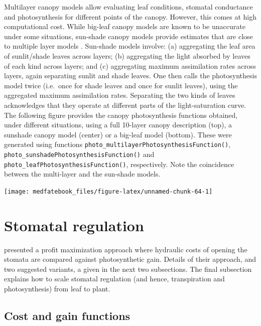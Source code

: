\documentclass[]{book}
\begin{document}
Multilayer canopy models allow evaluating leaf conditions, stomatal
conductance and photosynthesis for different points of the canopy.
However, this comes at high computational cost. While big-leaf canopy
models are known to be unaccurate under some situations, sun-shade
canopy models \citep{DePury1997} provide estimates that are close to
multiple layer models \citep{Hikosaka2016}. Sun-shade models involve:
(a) aggregating the leaf area of sunlit/shade leaves across layers; (b)
aggregating the light absorbed by leaves of each kind across layers; and
(c) aggregating maximum assimilation rates across layers, again
separating sunlit and shade leaves. One then calls the photosynthesis
model twice (i.e.~once for shade leaves and once for sunlit leaves),
using the aggregated maximum assimilation rates. Separating the two
kinds of leaves acknowledges that they operate at different parts of the
light-saturation curve. The following figure provides the canopy
photosynthesis functions obtained, under different situations, using a
full 10-layer canopy description (top), a sunshade canopy model (center)
or a big-leaf model (bottom). These were generated using functions
\texttt{photo\_multilayerPhotosynthesisFunction()},
\texttt{photo\_sunshadePhotosynthesisFunction()} and
\texttt{photo\_leafPhotosynthesisFunction()}, respectively. Note the
coincidence between the multi-layer and the sun-shade models.

\begin{center}\texttt{[image: medfatebook\_files/figure-latex/unnamed-chunk-64-1]} \end{center}

\section{Stomatal regulation}\label{stomatal-regulation}

\citet{Sperry2016} presented a profit maximization approach where
hydraulic costs of opening the stomata are compared against
photosynthetic gain. Details of their approach, and two suggested
variants, a given in the next two subsections. The final subsection
explains how to scale stomatal regulation (and hence, transpiration and
photosynthesis) from leaf to plant.

\subsection{Cost and gain functions}\label{cost-and-gain-functions}
\end{document}
